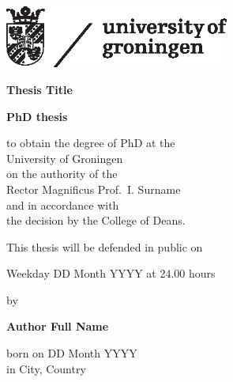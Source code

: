 %
%
\newcommand{\updatethis}[1]{{\color{red}#1}}
\resetpagenumbers
\cleardoublepage
\thispagestyle{empty}

\large
\vspace*{-3cm}

\hspace*{-0.5cm}\includegraphics[width=7.38cm]{figs/rugr_logoen_zwart_cmyk.eps}

\begin{center}

\vspace{1cm}%

{\fontsize{29pt}{34.8pt}\selectfont \textbf{\updatethis{Thesis Title}}}

\vspace{2.5cm}

\textbf{\Large{PhD thesis}}

\vspace{1.6cm}%

to obtain the degree of PhD at the\\
University of Groningen\\
on the authority of the\\
Rector Magnificus Prof.\ \updatethis{I. Surname}\\%
and in accordance with\\
the decision by the College of Deans.

\vspace{0.4cm}

This thesis will be defended in public on

\vspace{0.4cm}

\updatethis{Weekday DD Month YYYY at 24.00 hours}

\vspace{1.4cm}

by

\vspace{1.4cm}

\textbf{\Large{\updatethis{Author Full Name}}}\\

\vspace{0.4cm}

born on \updatethis{DD Month YYYY}\\%
in \updatethis{City, Country}
\end{center}


